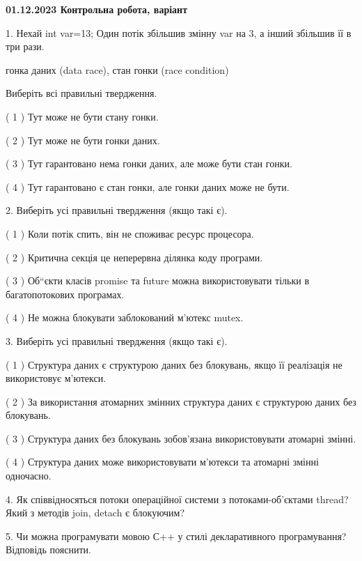\documentclass[12pt, ukrainian]{article}
\begin{document}
\vspace{4mm}
\newpage
\begin {large}

\textbf{01.12.2023 Контрольна робота, варіант  }\par


{
1. Нехай int var=13; Один потік збільшив змінну var на 3, а інший збільшив її в три рази.

гонка даних (data race), стан гонки (race condition)

Виберіть всі правильні твердження.\par
\vspace{2mm}
( 1 ) Тут може не бути стану гонки.%

( 2 ) Тут може не бути гонки даних.%

( 3 ) Тут гарантовано нема гонки даних, але може бути стан гонки.%

( 4 ) Тут гарантовано є стан гонки, але гонки даних може не бути.%


\vspace{5mm}
2. Виберіть усі правильні твердження (якщо такі є).\par
\vspace{2mm}

( 1 ) Коли потік спить, він не споживає ресурс процесора.%

( 2 ) Критична секція це неперервна ділянка коду програми.%

( 3 ) Об“єкти класів promise та future можна використовувати тільки в багатопотокових програмах.%

( 4 ) Не можна блокувати заблокований м’ютекс mutex.%


\vspace{5mm}
3. Виберіть усі правильні твердження (якщо такі є).\par
\vspace{2mm}

( 1 ) Структура даних є структурою даних без блокувань, якщо її реалізація не використовує м’ютекси.%

( 2 ) За використання атомарних змінних структура даних є структурою даних без блокувань.%

( 3 ) Структура даних без блокувань зобов’язана використовувати атомарні змінні.%

( 4 ) Структура даних може використовувати м’ютекси та атомарні змінні одночасно.%


\vspace{5mm}
4. Як співвідносяться потоки операційної системи з потоками-об’єктами thread? Який з методів join, detach є блокуючим?



\vspace{5mm}
5. Чи можна програмувати мовою С++ у стилі декларативного програмування? Відповідь пояснити.
}
\end {large}
\end{document}
